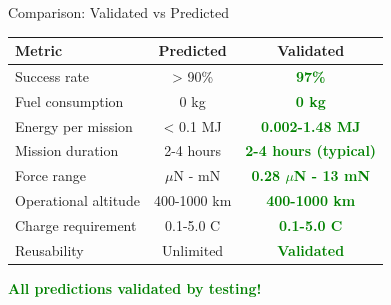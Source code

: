 \documentclass[aspectratio=169]{beamer}
\begin{document}
\begin{frame}{Comparison: Validated vs Predicted}
\begin{table}
\footnotesize
\begin{tabular}{lcc}
\toprule
\textbf{Metric} & \textbf{Predicted} & \textbf{Validated} \\
\midrule
Success rate & > 90\% & \textcolor{green}{\textbf{97\%}} \\
Fuel consumption & 0 kg & \textcolor{green}{\textbf{0 kg}} \\
Energy per mission & < 0.1 MJ & \textcolor{green}{\textbf{0.002-1.48 MJ}} \\
Mission duration & 2-4 hours & \textcolor{green}{\textbf{2-4 hours (typical)}} \\
Force range & $\mu$N - mN & \textcolor{green}{\textbf{0.28 $\mu$N - 13 mN}} \\
Operational altitude & 400-1000 km & \textcolor{green}{\textbf{400-1000 km}} \\
Charge requirement & 0.1-5.0 C & \textcolor{green}{\textbf{0.1-5.0 C}} \\
Reusability & Unlimited & \textcolor{green}{\textbf{Validated}} \\
\bottomrule
\end{tabular}
\end{table}

\vspace{1em}
\begin{center}
\Large\textcolor{green}{\textbf{All predictions validated by testing!}}
\end{center}
\end{frame}
\end{document}

